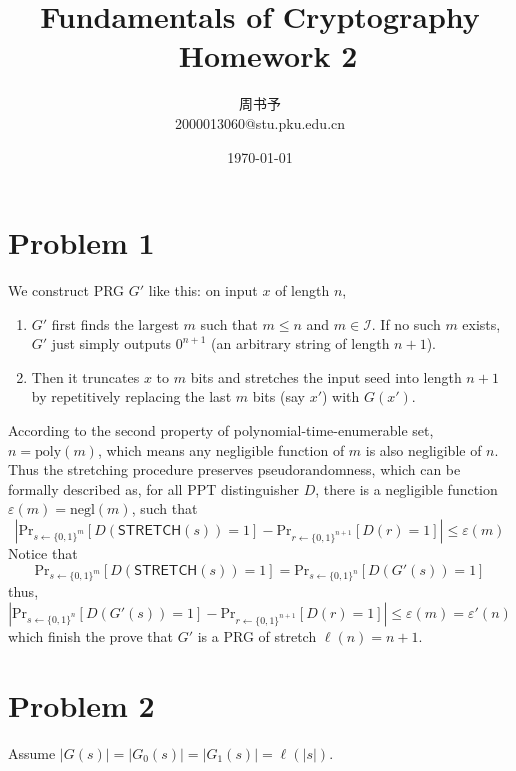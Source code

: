 \documentclass[8pt]{article}
\title{\heiti\zihao{1} Fundamentals  of Cryptography \ Homework 2}
\author{\kaishu\zihao{-3} 周书予\\2000013060@stu.pku.edu.cn}
\date{\today}
\theoremstyle{compact}
\def\le{\leqslant}
\begin{document}
\large
{}
\pagestyle{plain}



\maketitle

\section*{Problem 1}

We construct PRG $G'$ like this: on input $x$ of length $n$,
\begin{enumerate}
	\item $G'$ first finds the largest $m$ such that $m \le n$ and $m \in \mathcal I$. If no such $m$ exists, $G'$ just simply outputs $0^{n+1}$ (an arbitrary string of length $n + 1$).
	\item Then it truncates $x$ to $m$ bits and stretches the input seed into length $n + 1$ by repetitively replacing the last $m$ bits (say $x'$) with $G(x')$.
\end{enumerate}

According to the second property of polynomial-time-enumerable set, $n = \text{poly}(m)$, which means any negligible function of $m$ is also negligible of $n$. Thus the stretching procedure preserves pseudorandomness, which can be formally described as, for all PPT distinguisher $D$, there is a negligible function $\varepsilon(m) = \text{negl}(m)$, such that $$\left|\text{Pr}_{s \gets \{0, 1\}^m}[D(\textsf{STRETCH}(s)) = 1] - \text{Pr}_{r \gets \{0, 1\}^{n+1}}[D(r) = 1]\right| \le \varepsilon(m)$$
Notice that $$\text{Pr}_{s \gets \{0, 1\}^m}[D(\textsf{STRETCH}(s)) = 1] = \text{Pr}_{s \gets \{0, 1\}^n}[D(G'(s)) = 1]$$
thus, $$\left|\text{Pr}_{s \gets \{0, 1\}^n}[D(G'(s)) = 1] - \text{Pr}_{r \gets \{0, 1\}^{n+1}}[D(r) = 1]\right| \le \varepsilon(m) = \varepsilon'(n)$$
which finish the prove that $G'$ is a PRG of stretch $\ell(n) = n + 1$.

\section*{Problem 2}

Assume $|G(s)| = |G_0(s)| = |G_1(s)| = \ell(|s|)$.
\end{document}
